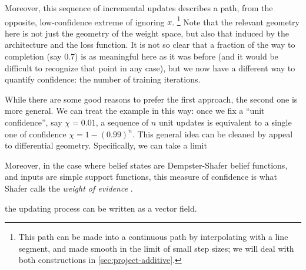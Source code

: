 Moreover, this sequence of incremental updates describes a path, from the opposite, low-confidence extreme of ignoring $x$.%
	\footnote{This path can be made into a continuous path by interpolating with a line segment, and made smooth in the limit of small step sizes; we will deal with both constructions in \cref{sec:project-additive}.}
Note that the relevant geometry here is not just the geometry of the weight space, but also that induced by the architecture and the loss function.
It is not so clear that a fraction of the way to completion (say 0.7) is as meaningful here as it was before (and it would be difficult to recognize that point in any case),
but we now have a different way to quantify confidence: the number of training iterations. 

While there are some good reasons to prefer the first approach, 
the second one is more general. 
We can treat the example in this way: once we fix a ``unit confidence'', say $\chi=0.01$, a sequence of $n$ unit updates is equivalent to a single one of confidence $\chi= 1-(0.99)^n$. 
This general idea can be cleaned by appeal to differential geometry.
Specifically, we can take a limit

Moreover, in the case where belief states are Dempster-Shafer belief functions, 
and inputs are simple support functions, this measure of confidence is what Shafer calls the \emph{weight of evidence} \parencite{shafer1976mathematical}.

the updating process can be written as a vector field.






